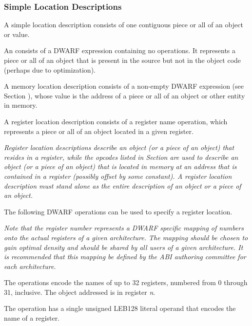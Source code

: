 \subsubsection{Simple Location Descriptions}
A 
simple location description consists of one 
contiguous piece or all of an object or value.

An 
consists of a DWARF expression
containing no operations. It represents a piece or all of an
object that is present in the source but not in the object code
(perhaps due to optimization).

A 
memory location description 
consists of a non-empty DWARF
expression (see 
Section ), 
whose value is the address of
a piece or all of an object or other entity in memory.

\label{chap:registerlocationdescriptions}
A register location description consists of a register name
operation, which represents a piece or all of an object
located in a given register.

\textit{Register location descriptions describe an object
(or a piece of an object) that resides in a register, while
the opcodes listed in 
Section 
are used to describe an object (or a piece of
an object) that is located in memory at an address that is
contained in a register (possibly offset by some constant). A
register location description must stand alone as the entire
description of an object or a piece of an object.
}

The following DWARF operations can be used to 
specify a register location.

\textit{Note that the register number represents a DWARF specific
mapping of numbers onto the actual registers of a given
architecture. The mapping should be chosen to gain optimal
density and should be shared by all users of a given
architecture. It is recommended that this mapping be defined
by the ABI authoring committee for each architecture.
}
\begin{enumerate}[1. ]
The \DWOPregnTARG{} operations encode the names of up to 32
registers, numbered from 0 through 31, inclusive. The object
addressed is in register \textit{n}.

\itembfnl{\DWOPregxTARG}
The \DWOPregxNAME{} operation has a single 
unsigned LEB128 literal
operand that encodes the name of a register.  

\end{enumerate}

